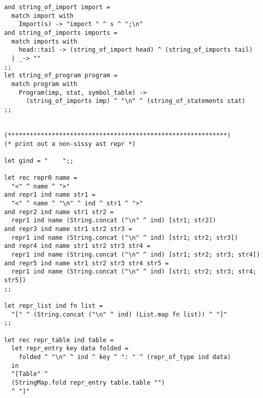 \begin{verbatim}
and string_of_import import =
  match import with
    Import(s) -> "import " ^ s ^ ";\n"
and string_of_imports imports =
  match imports with
    head::tail -> (string_of_import head) ^ (string_of_imports tail)
  | _-> ""
;;
let string_of_program program =
  match program with
    Program(imp, stat, symbol_table) ->
      (string_of_imports imp) ^ "\n" ^ (string_of_statements stat)
;;


(************************************************************)
(* print out a non-sissy ast repr *)

let gind = "    ";;

let rec repr0 name =
  "<" ^ name ^ ">"
and repr1 ind name str1 =
  "<" ^ name ^ "\n" ^ ind ^ str1 ^ ">"
and repr2 ind name str1 str2 =
  repr1 ind name (String.concat ("\n" ^ ind) [str1; str2])
and repr3 ind name str1 str2 str3 =
  repr1 ind name (String.concat ("\n" ^ ind) [str1; str2; str3])
and repr4 ind name str1 str2 str3 str4 =
  repr1 ind name (String.concat ("\n" ^ ind) [str1; str2; str3; str4])
and repr5 ind name str1 str2 str3 str4 str5 =
  repr1 ind name (String.concat ("\n" ^ ind) [str1; str2; str3; str4; str5])
;;

let repr_list ind fn list =
  "[" ^ (String.concat ("\n" ^ ind) (List.map fn list)) ^ "]"
;;

let rec repr_table ind table =
  let repr_entry key data folded =
    folded ^ "\n" ^ ind ^ key ^ ": " ^ (repr_of_type ind data)
  in
  "[Table" ^
  (StringMap.fold repr_entry table.table "")
  ^ "]"


\end{verbatim}
